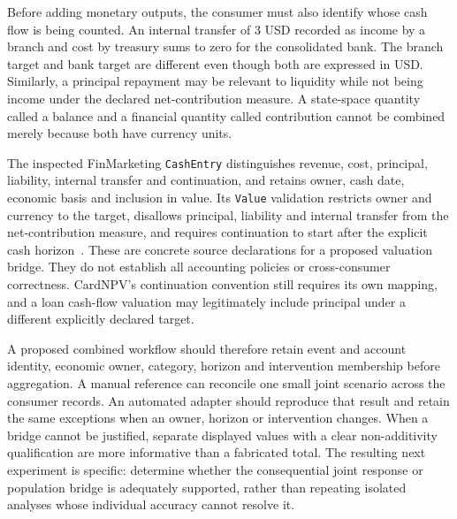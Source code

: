 Before adding monetary outputs, the consumer must also identify whose cash
flow is being counted. An internal transfer of $3$ USD recorded as income by
a branch and cost by treasury sums to zero for the consolidated bank. The
branch target and bank target are different even though both are expressed in
USD. Similarly, a principal repayment may be relevant to liquidity while not
being income under the declared net-contribution measure. A state-space
quantity called a balance and a financial quantity called contribution cannot
be combined merely because both have currency units.

The inspected FinMarketing \texttt{CashEntry} distinguishes revenue, cost,
principal, liability, internal transfer and continuation, and retains owner,
cash date, economic basis and inclusion in value. Its \texttt{Value}
validation restricts owner and currency to the target, disallows principal,
liability and internal transfer from the net-contribution measure, and
requires continuation to start after the explicit cash horizon~\citep{exec13_i3_composition}. These are concrete source declarations for a
proposed valuation bridge. They do not establish all accounting policies or
cross-consumer correctness. CardNPV's continuation convention still requires
its own mapping, and a loan cash-flow valuation may legitimately include
principal under a different explicitly declared target.

A proposed combined workflow should therefore retain event and account
identity, economic owner, category, horizon and intervention membership before
aggregation. A manual reference can reconcile one small joint scenario across
the consumer records. An automated adapter should reproduce that result and
retain the same exceptions when an owner, horizon or intervention changes.
When a bridge cannot be justified, separate displayed values with a clear
non-additivity qualification are more informative than a fabricated total.
The resulting next experiment is specific: determine whether the consequential
joint response or population bridge is adequately supported, rather than
repeating isolated analyses whose individual accuracy cannot resolve it.
